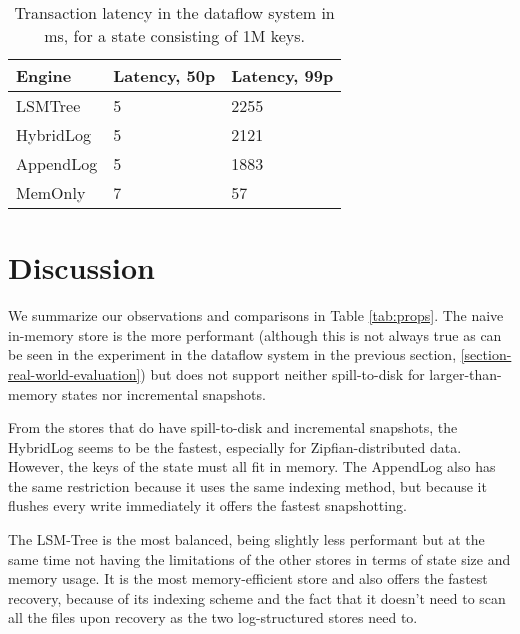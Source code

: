 \begin{table}[]
\centering
\begin{tabular}{@{}lll@{}}
\toprule
\textbf{Engine} & \textbf{Latency, 50p} & \textbf{Latency, 99p} \\ \midrule
LSMTree & 5 & 2255 \\
HybridLog & 5 & 2121 \\
AppendLog & 5 & 1883 \\
MemOnly & 7 & 57 \\ \bottomrule
\end{tabular}
\caption{Transaction latency in the dataflow system in ms, for a state consisting of 1M keys.}
\label{tab:latencies}
\end{table}

\section{Discussion}

We summarize our observations and comparisons in Table \ref{tab:props}. The naive in-memory store is the more performant (although this is not always true as can be seen in the experiment in the dataflow system in the previous section, \ref{section-real-world-evaluation}) but does not support neither spill-to-disk for larger-than-memory states nor incremental snapshots.

From the stores that do have spill-to-disk and incremental snapshots, the HybridLog seems to be the fastest, especially for Zipfian-distributed data. However, the keys of the state must all fit in memory. The AppendLog also has the same restriction because it uses the same indexing method, but because it flushes every write immediately it offers the fastest snapshotting.

The LSM-Tree is the most balanced, being slightly less performant but at the same time not having the limitations of the other stores in terms of state size and memory usage. It is the most memory-efficient store and also offers the fastest recovery, because of its indexing scheme and the fact that it doesn't need to scan all the files upon recovery as the two log-structured stores need to.

